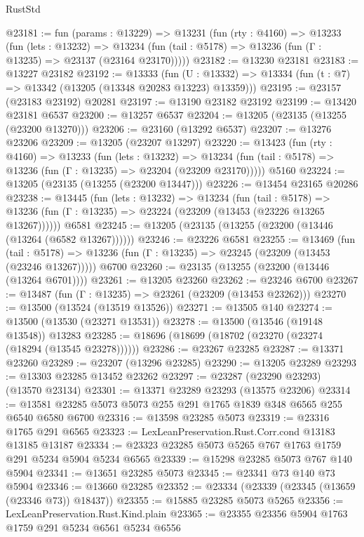 \begin{lexlean}{RustStd}
\begin{coremodule}
@23181 := fun (params : @13229) =>
  @13231
    (fun (rty : @4160) =>
    @13233
      (fun (lets : @13232) =>
      @13234 (fun (tail : @5178) => @13236 (fun (Γ : @13235) => @23137 (@23164 @23170)))))
@23182 := @13230 @23181
@23183 := @13227 @23182
@23192 := @13333
    (fun (U : @13332) => @13334 (fun (t : @7) => @13342 (@13205 (@13348 @20283 @13223) @13359)))
@23195 := @23157 (@23183 @23192) @20281
@23197 := @13190 @23182 @23192
@23199 := @13420 @23181 @6537
@23200 := @13257 @6537
@23204 := @13205 (@23135 (@13255 (@23200 @13270)))
@23206 := @23160 (@13292 @6537)
@23207 := @13276 @23206
@23209 := @13205 (@23207 @13297)
@23220 := @13423
    (fun (rty : @4160) =>
    @13233
      (fun (lets : @13232) =>
      @13234 (fun (tail : @5178) => @13236 (fun (Γ : @13235) => @23204 (@23209 @23170)))))
    @5160
@23224 := @13205 (@23135 (@13255 (@23200 @13447)))
@23226 := @13454 @23165 @20286
@23238 := @13445
    (fun (lets : @13232) =>
    @13234
      (fun (tail : @5178) =>
      @13236 (fun (Γ : @13235) => @23224 (@23209 (@13453 (@23226 @13265 @13267))))))
    @6581
@23245 := @13205 (@23135 (@13255 (@23200 (@13446 (@13264 (@6582 @13267))))))
@23246 := @23226 @6581
@23255 := @13469
    (fun (tail : @5178) => @13236 (fun (Γ : @13235) => @23245 (@23209 (@13453 (@23246 @13267)))))
    @6700
@23260 := @23135 (@13255 (@23200 (@13446 (@13264 @6701))))
@23261 := @13205 @23260
@23262 := @23246 @6700
@23267 := @13487 (fun (Γ : @13235) => @23261 (@23209 (@13453 @23262)))
@23270 := @13500 (@13524 (@13519 @13526))
@23271 := @13505 @140
@23274 := @13500 (@13530 (@23271 @13531))
@23278 := @13500 (@13546 (@19148 @13548)) @13283
@23285 := @18696 (@18699 (@18702 (@23270 (@23274 (@18294 (@13545 @23278))))))
@23286 := @23267 @23285
@23287 := @13371 @23260
@23289 := @23207 (@13296 @23285)
@23290 := @13205 @23289
@23293 := @13303 @23285 @13452 @23262
@23297 := @23287 (@23290 @23293) (@13570 @23134)
@23301 := @13371 @23289 @23293 (@13575 @23206)
@23314 := @13581 @23285 @5073 @5073 @255 @291 @1765 @1839 @348 @6565 @255 @6540 @6580 @6700
@23316 := @13598 @23285 @5073
@23319 := @23316 @1765 @291 @6565
@23323 := LexLeanPreservation.Rust.Corr.cond @13183 @13185 @13187
@23334 := @23323 @23285 @5073 @5265 @767 @1763 @1759 @291 @5234 @5904 @5234 @6565
@23339 := @15298 @23285 @5073 @767 @140 @5904
@23341 := @13651 @23285 @5073
@23345 := @23341 @73 @140 @73 @5904
@23346 := @13660 @23285
@23352 := @23334 (@23339 (@23345 (@13659 (@23346 @73)) @18437))
@23355 := @15885 @23285 @5073 @5265
@23356 := LexLeanPreservation.Rust.Kind.plain
@23365 := @23355 @23356 @5904 @1763 @1759 @291 @5234 @6561 @5234 @6556

\end{coremodule}
\end{lexlean}
